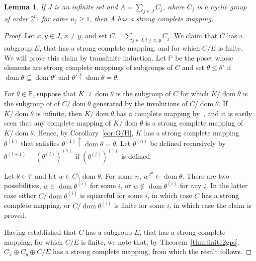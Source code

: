 \documentclass[12pt,a4paper]{article}
\newtheorem{lem}[thm]{Lemma}
\DeclareMathOperator{\dom}{dom}
\newcommand{\rest}{\mathbin{\upharpoonright}}
\begin{document}
\begin{lem}\label{lem:InftyDirSum}
If $J$ is an infinite set and $A=\sum_{j\in J}C_j$, where $C_j$ is a cyclic group of order $2^{n_j}$ for some $n_j\ge 1$, then $A$ has a strong complete mapping.
\end{lem}
\begin{proof}
Let $x,y\in J$, $x\ne y$, and set $C=\sum_{j\in J, i\ne x,y}C_j$. We claim that $C$ has a subgroup $E$, that has a strong complete mapping, and for which $C/E$ is finite. We will prove this claim by transfinite induction. Let $\mathbb{P}$ be the poset whose elements are strong complete mappings of subgroups of $C$ and set $\theta\le\theta'$ if $\dom\theta\subseteq\dom\theta'$ and $\theta'\rest\dom\theta=\theta$.

For $\theta\in\mathbb{P}$, suppose that $K\supseteq\dom\theta$ is the subgroup of $C$ for which $K/\dom\theta$ is the subgroup of of $C/\dom\theta$ generated by the involutions of $C/\dom\theta$. If $K/\dom\theta$ is infinite, then $K/\dom\theta$ has a complete mapping by~\cite{Bateman50}, and it is easily seen that any complete mapping of $K/\dom\theta$ is a strong complete mapping of $K/\dom\theta$. Hence, by Corollary~\ref{cor:G/H}, $K$ has a strong complete mapping $\theta^{(1)}$ that satisfies $\theta^{(1)}\rest \dom\theta=\theta$. Let $\theta^{(n)}$ be defined recursively by $\theta^{(i+1)}=(\theta^{(i)})^{(1)}$ if  $(\theta^{(i)})^{(1)}$ is defined.

Let $\theta\in\mathbb{P}$ and let $w\in C\setminus\dom\theta$. For some $n$, $w^{2^n}\in\dom\theta$. There are two possibilities, $w\in\dom\theta^{(i)}$ for some $i$, or  $w\not\in\dom\theta^{(i)}$ for any $i$. In the latter case either $C/\dom\theta^{(i)}$ is squareful for some $i$, in which case $C$ has a strong complete mapping, or $C/\dom\theta^{(i)}$ is finite for some $i$, in which case the claim is proved.

Having established that $C$ has a subgroup $E$, that has a strong complete mapping, for which $C/E$ is finite, we note that, by Theorem~\ref{thm:finite2gps}, $C_x\oplus C_y\oplus C/E$ has a strong complete mapping, from which the result follows.
\end{proof}
\end{document}
